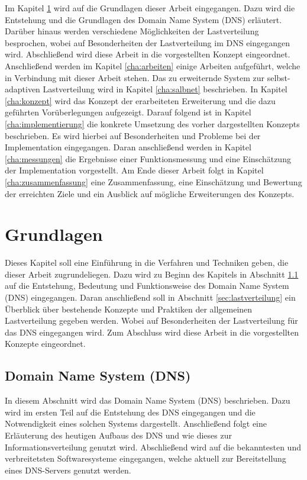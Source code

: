 \documentclass[a4paper, 12pt, BCOR10mm, DIV12, toc=bibliography, toc=listof, german]{scrbook}
\def \dns {Domain Name System (DNS)}
\begin{document}
		Im Kapitel \ref{cha:grundlagen} wird auf die Grundlagen dieser Arbeit eingegangen. Dazu wird die
		Entstehung und die Grundlagen des \dns{} erläutert. Darüber hinaus werden verschiedene
		Möglichkeiten der Lastverteilung besprochen, wobei auf Besonderheiten der Lastverteilung im DNS
		eingegangen wird. Abschließend wird diese Arbeit in die vorgestellten Konzept eingeordnet.
		Anschließend werden im Kapitel \ref{cha:arbeiten} einige Arbeiten aufgeführt, welche in
		Verbindung mit dieser Arbeit stehen. Das zu erweiternde System zur selbst-adaptiven
		Lastverteilung wird in Kapitel \ref{cha:salbnet} beschrieben. In Kapitel \ref{cha:konzept} wird
		das Konzept der erarbeiteten Erweiterung und die dazu geführten Vorüberlegungen aufgezeigt.
		Darauf folgend ist in Kapitel \ref{cha:implementierung} die konkrete Umsetzung des vorher
		dargestellten Konzepts beschrieben. Es wird hierbei auf Besonderheiten und Probleme bei der
		Implementation eingegangen.  Daran anschließend werden in Kapitel \ref{cha:messungen} die
		Ergebnisse einer Funktionsmessung und eine Einschätzung der Implementation vorgestellt. Am Ende
		dieser Arbeit folgt in Kapitel \ref{cha:zusammenfassung} eine Zusammenfassung, eine
		Einschätzung und Bewertung der erreichten Ziele und ein Ausblick auf mögliche Erweiterungen des
		Konzepts.


	\chapter{Grundlagen} %
	\label{cha:grundlagen}

		Dieses Kapitel soll eine Einführung in die Verfahren und Techniken geben, die dieser Arbeit
		zugrundeliegen.  Dazu wird zu Beginn des Kapitels in Abschnitt \ref{sec:dns} auf die Entstehung,
		Bedeutung und Funktionsweise des \dns{} eingegangen. Daran anschließend soll in Abschnitt
		\ref{sec:lastverteilung} ein Überblick über bestehende Konzepte und Praktiken der allgemeinen
		Lastverteilung gegeben werden. Wobei auf Besonderheiten der Lastverteilung für das DNS
		eingegangen wird. Zum Abschluss wird diese Arbeit in die vorgestellten Konzepte eingeordnet. 

		\section{Domain Name System (DNS)} %
		\label{sec:dns}

		In diesem Abschnitt wird das \dns{} \cite{rfc1034,rfc1035} beschrieben. Dazu wird im ersten Teil
		auf die Entstehung des DNS eingegangen und die Notwendigkeit eines solchen Systems dargestellt.
		Anschließend folgt eine Erläuterung des heutigen Aufbaus des DNS und wie dieses zur
		Informationsverteilung genutzt wird.  Abschließend wird auf die bekanntesten und verbreitetsten
		Softwaresysteme eingegangen, welche aktuell zur Bereitstellung eines DNS-Servers genutzt werden.
\end{document}
